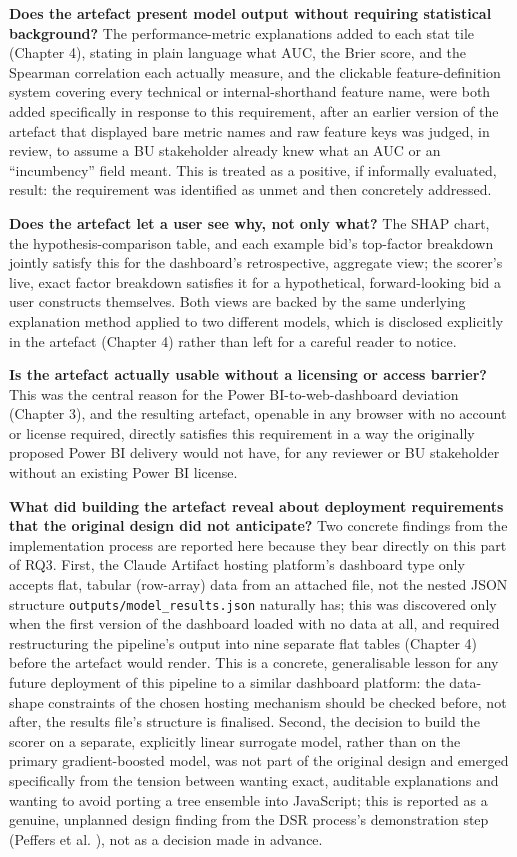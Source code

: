 \textbf{Does the artefact present model output without requiring
statistical background?} The performance-metric explanations added to
each stat tile (Chapter 4), stating in plain language what AUC, the
Brier score, and the Spearman correlation each actually measure, and the
clickable feature-definition system covering every technical or
internal-shorthand feature name, were both added specifically in
response to this requirement, after an earlier version of the artefact
that displayed bare metric names and raw feature keys was judged, in
review, to assume a BU stakeholder already knew what an AUC or an
``incumbency'' field meant. This is treated as a positive, if informally
evaluated, result: the requirement was identified as unmet and then
concretely addressed.

\textbf{Does the artefact let a user see why, not only what?} The SHAP
chart, the hypothesis-comparison table, and each example bid's
top-factor breakdown jointly satisfy this for the dashboard's
retrospective, aggregate view; the scorer's live, exact factor breakdown
satisfies it for a hypothetical, forward-looking bid a user constructs
themselves. Both views are backed by the same underlying explanation
method applied to two different models, which is disclosed explicitly in
the artefact (Chapter 4) rather than left for a careful reader to
notice.

\textbf{Is the artefact actually usable without a licensing or access
barrier?} This was the central reason for the Power BI-to-web-dashboard
deviation (Chapter 3), and the resulting artefact, openable in any
browser with no account or license required, directly satisfies this
requirement in a way the originally proposed Power BI delivery would not
have, for any reviewer or BU stakeholder without an existing Power BI
license.

\textbf{What did building the artefact reveal about deployment
requirements that the original design did not anticipate?} Two concrete
findings from the implementation process are reported here because they
bear directly on this part of RQ3. First, the Claude Artifact hosting
platform's dashboard type only accepts flat, tabular (row-array) data
from an attached file, not the nested JSON structure
\texttt{outputs/model\_results.json} naturally has; this was discovered
only when the first version of the dashboard loaded with no data at all,
and required restructuring the pipeline's output into nine separate flat
tables (Chapter 4) before the artefact would render. This is a concrete,
generalisable lesson for any future deployment of this pipeline to a
similar dashboard platform: the data-shape constraints of the chosen
hosting mechanism should be checked before, not after, the results
file's structure is finalised. Second, the decision to build the scorer
on a separate, explicitly linear surrogate model, rather than on the
primary gradient-boosted model, was not part of the original design and
emerged specifically from the tension between wanting exact, auditable
explanations and wanting to avoid porting a tree ensemble into
JavaScript; this is reported as a genuine, unplanned design finding from
the DSR process's demonstration step (Peffers et al.
\citeyearpar{peffers2007design}), not as a decision made in advance.

